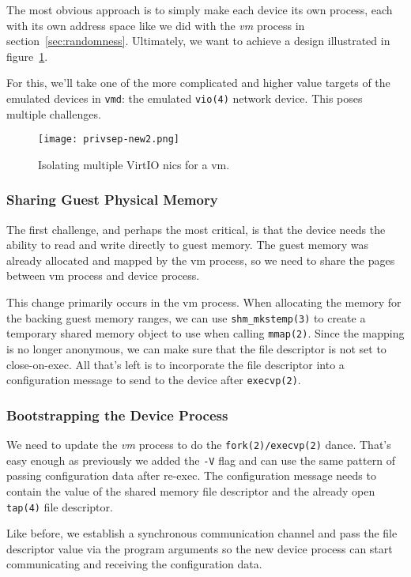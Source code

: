 \documentclass[conference]{IEEEtran}
\begin{document}
The most obvious approach is to simply make each device its own
process, each with its own address space like we did with the
\emph{vm} process in section~\ref{sec:randomness}. Ultimately, we want
to achieve a design illustrated in figure~\ref{fig:new2}.

For this, we'll take one of the more complicated and higher value
targets of the emulated devices in \texttt{vmd}: the emulated
\texttt{vio(4)} network device. This poses multiple challenges.

\begin{figure}
  \label{fig:new2}
  \texttt{[image: privsep-new2.png]}
  \caption{Isolating multiple VirtIO nics for a vm.}
\end{figure}


\vspace{2mm}
\subsubsection{Sharing Guest Physical Memory}
The first challenge, and perhaps the most critical, is that the device
needs the ability to read and write directly to guest memory. The
guest memory was already allocated and mapped by the vm process, so we
need to share the pages between vm process and device process.

This change primarily occurs in the vm process. When allocating the
memory for the backing guest memory ranges, we can use
\texttt{shm\_mkstemp(3)} to create a temporary shared memory object
to use when calling \texttt{mmap(2)}. Since the mapping is no longer
anonymous, we can make sure that the file descriptor is not set to
close-on-exec. All that's left is to incorporate the file descriptor
into a configuration message to send to the device after
\texttt{execvp(2)}.


\vspace{2mm}
\subsubsection{Bootstrapping the Device Process}
We need to update the \emph{vm} process to do the
\texttt{fork(2)/execvp(2)} dance. That's easy enough as previously we
added the \texttt{-V} flag and can use the same pattern of passing
configuration data after re-exec. The configuration message needs to
contain the value of the shared memory file descriptor and the already
open \texttt{tap(4)} file descriptor.

Like before, we establish a synchronous communication channel and pass
the file descriptor value via the program arguments so the new device
process can start communicating and receiving the configuration data.
\end{document}
